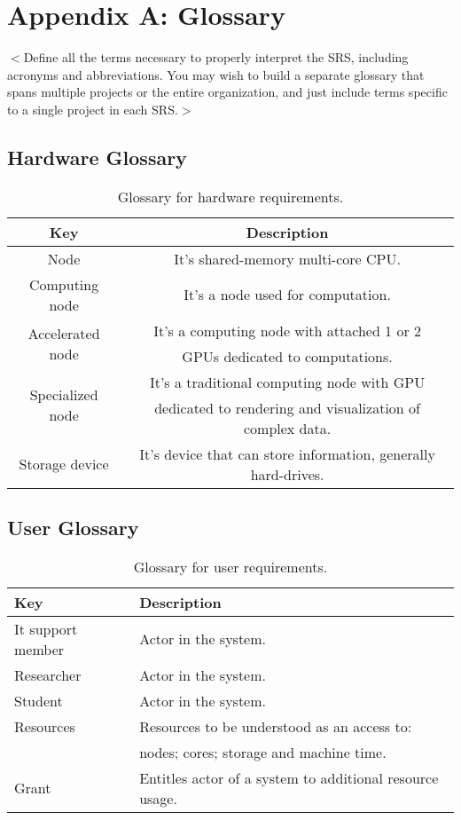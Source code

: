 \documentclass{report}
\begin{document}
\section{Appendix A: Glossary}
$<$Define all the terms necessary to properly interpret the SRS, including 
acronyms and abbreviations. You may wish to build a separate glossary that spans 
multiple projects or the entire organization, and just include terms specific to 
a single project in each SRS.$>$

\subsection{Hardware Glossary} \label{app:glossary:hardware}
	\begin{table}[!htbp]
		\centering
		\caption{Glossary for hardware requirements.}
		\label{tab:hardware_requirements_glossary}
		\begin{tabular}{|c|c|}
			\hline
			\textbf{Key} & \textbf{Description} \\ \hline \hline
			Node & It's shared-memory multi-core CPU.\\ \hline
			Computing node & It's a node used for computation. \\ \hline
			\multirow{2}{*}{Accelerated node} &  It's a computing node with attached 1 or 2 \\ & GPUs dedicated to computations.\\ \hline
			\multirow{2}{*}{Specialized node} & It's a traditional computing node with GPU \\& dedicated to rendering and visualization of complex data. \\ \hline \hline
			Storage device & It's device that can store information, generally hard-drives. \\ \hline
		\end{tabular}
	\end{table}
\clearpage
\subsection{User Glossary} \label{app:glossary:user}
	\begin{table}[!htbp]
		\centering
		\caption{Glossary for user requirements.}
		\label{tab:user_requirements_glossary}
		\begin{tabular}{|l|l|}
			\hline
			\textbf{Key} & \textbf{Description} \\ \hline \hline
			It support member & Actor in the system. \\ \hline
			Researcher & Actor in the system. \\ \hline
			Student & Actor in the system. \\ \hline
			Resources & Resources to be understood as an access to:\\& nodes; cores; storage and machine time.\\ \hline
			Grant & Entitles actor of a system to additional resource usage. \\ \hline
		\end{tabular}
	\end{table}
\clearpage
\end{document}
